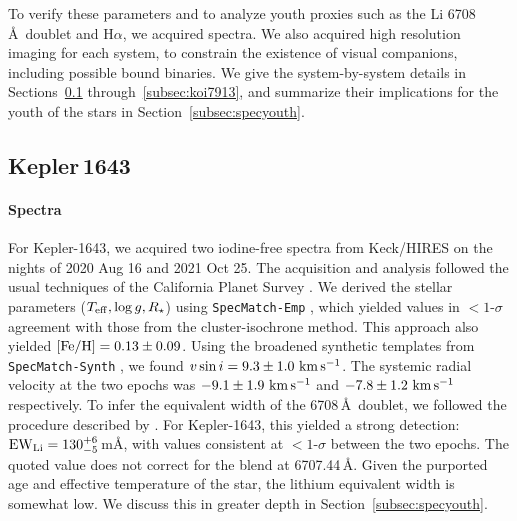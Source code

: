 \documentclass[12pt,twocolumn,tighten,linenumbers]{aastex63}
\newcommand{\mkms}{{\rm \,km\,s^{-1}}}  %
\begin{document}
To verify these parameters and to analyze youth
proxies such as the Li 6708\,\AA\ doublet and H$\alpha$, we acquired
 spectra.  We also acquired high resolution imaging for each system, to
constrain the existence of visual companions, including possible bound
binaries.  We give the system-by-system details in Sections~\ref{subsec:kep1643}
through~\ref{subsec:koi7913}, and summarize their implications for
the youth of the stars in Section~\ref{subsec:specyouth}.

\subsection{Kepler\,1643}
\label{subsec:kep1643}

\paragraph{Spectra}
For Kepler-1643, we acquired two iodine-free spectra from Keck/HIRES
on the nights of 2020 Aug 16 and 2021 Oct 25.  The acquisition and
analysis followed the usual techniques of the California Planet Survey
\citep{howard_cps_2010}.  We derived the stellar parameters ($T_{\rm
eff}, \log g, R_\star$) using \texttt{SpecMatch-Emp}
\citep{yee_SM_2017}, which yielded values in $<$$1$-$\sigma$ agreement
with those from the cluster-isochrone method.  This approach also
yielded $[{\rm Fe/H}]=0.13 \pm 0.09$.  Using the broadened synthetic
templates
 from \texttt{SpecMatch-Synth} \citep{petigura_cksi_2017}, we
found $v\sin i = 9.3 \pm 1.0\,\mkms$.  The systemic radial velocity at
the two epochs was $-9.1 \pm 1.9\,\mkms$ and $-7.8\pm 1.2\,\mkms$
respectively.  To infer the equivalent width of
the  6708\,\AA\ doublet, we followed the procedure
described by \citet{bouma_2021_ngc2516}.   For Kepler-1643, this yielded a
strong detection: ${\rm EW}_{\rm Li} = 130^{+6}_{-5}$\,m\AA, with
values consistent at $<$$1$-$\sigma$ between the two epochs.   The
quoted value does not correct for the  blend at
6707.44\,\AA.  Given the purported age and effective temperature of
the star, the lithium equivalent width is somewhat low.  We discuss
this in greater depth in Section~\ref{subsec:specyouth}.
\end{document}
